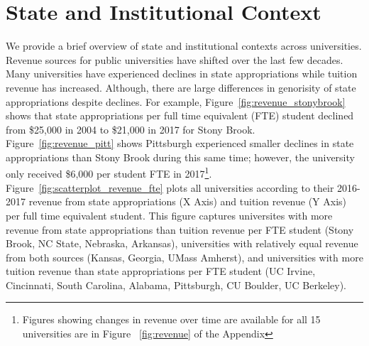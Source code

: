 \documentclass[twoside]{article}
\begin{document}

\section*{State and Institutional Context}
We provide a brief overview of state and institutional contexts across universities. Revenue sources for public universities have shifted over the last few decades. Many universities have experienced declines in state appropriations while tuition revenue has increased. Although, there are large differences in genorisity of state appropriations despite declines. For example, Figure~\ref{fig:revenue_stonybrook} shows that state appropriations per full time equivalent (FTE) student declined from \$25,000 in 2004 to \$21,000 in 2017 for Stony Brook. Figure~\ref{fig:revenue_pitt} shows Pittsburgh experienced smaller declines in state appropriations than Stony Brook during this same time; however, the university only received \$6,000 per student FTE in 2017\footnote{Figures showing changes in revenue over time are available for all 15 universities are in Figure ~\ref{fig:revenue} of the Appendix}. Figure~\ref{fig:scatterplot_revenue_fte} plots all universities according to their 2016-2017 revenue from state appropriations (X Axis) and tuition revenue (Y Axis) per full time equivalent student. This figure captures universites with more revenue from state appropriations than tuition revenue per FTE student (Stony Brook, NC State, Nebraska, Arkansas), universities with relatively equal revenue from both sources (Kansas, Georgia, UMass Amherst), and universities with more tuition revenue than state appropriations per FTE student (UC Irvine, Cincinnati, South Carolina, Alabama, Pittsburgh, CU Boulder, UC Berkeley).

\end{document}
